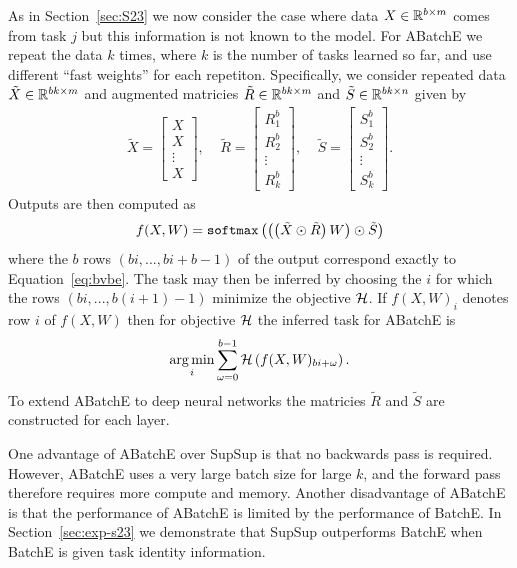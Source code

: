 \documentclass{article}
\DeclareMathOperator*{\argmin}{arg\,min}
\newcommand{\ac}{SupSup\xspace}
\newcommand{\comments}[1]{#1}
\newcommand{\comments}[1]{}
\newcommand{\vivekr}[1]{\comments{\textcolor{purple}{[vivek: #1]}}}
\begin{document}
As in Section~\ref{sec:S23} we now consider the case where data $X \in \mathbb{R}^{b \times m}$ comes from task $j$ but this information is not known to the model. For ABatchE we repeat the data $k$ times, where $k$ is the number of tasks learned so far, and use different ``fast weights'' for each repetiton. Specifically, we consider repeated data $\tilde X \in \mathbb{R}^{bk \times m}$ and augmented matricies $\tilde R \in \mathbb{R}^{bk \times m}$ and $\tilde S \in \mathbb{R}^{bk \times n}$ given by
\begin{align}
\tilde X = \begin{bmatrix} X \\ X \\ \vdots \\ X \end{bmatrix}, \ \ \ \ \ \tilde R =\begin{bmatrix} R^b_1 \\ R^b_2 \\ \vdots \\ R^b_k \end{bmatrix},  \ \ \ \ \   \tilde S =\begin{bmatrix} S^b_1 \\ S^b_2 \\ \vdots \\ S^b_k \end{bmatrix} .
\end{align}
Outputs are then computed as
\begin{align} \label{eq:bvabe}
    f(X, W) = \texttt{softmax}\left(  \left( \left( \tilde X \odot \tilde R  \right)  W \right) \odot \tilde S  \right)
\end{align}
where the $b$ rows $(bi,...,bi + b-1)$ of the output correspond exactly to Equation~\ref{eq:bvbe}. The task may then be inferred by choosing the $i$ for which the rows $(bi,...,b(i+1) - 1)$ minimize the objective $\mathcal{H}$. If $f(X, W)_i$ denotes row $i$ of $f(X, W)$ then for objective $\mathcal{H}$ the inferred task for ABatchE is
\begin{align}
    \argmin_i \sum_{\omega = 0}^{b-1} \Hcal\round{f(X, W)_{bi + \omega}}.
\end{align}
To extend ABatchE to deep neural networks the matricies $\tilde R$ and $\tilde S$ are constructed for each layer.

One advantage of ABatchE over \ac is that no backwards pass is required. However, ABatchE uses a very large batch size for large $k$, and the forward pass therefore requires more compute and memory. %
Another disadvantage of ABatchE is that the performance of ABatchE is limited by the performance of BatchE. In Section~\ref{sec:exp-s23} we demonstrate that \ac outperforms BatchE when BatchE is given task identity information.
\end{document}
